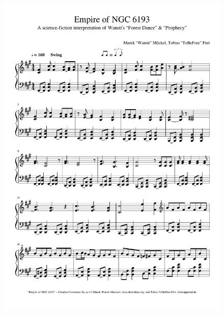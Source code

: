 \begin{figure}[p]
    \includegraphics[width=\textwidth, page=1]{z-include-ia3theme.pdf}
\end{figure}

